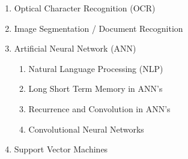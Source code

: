 \documentclass[12pt]{article}
\begin{document}
\begin{appendix}
      \begin{enumerate}
      \item Optical Character Recognition (OCR) \nocite{reul2019ocr4all} \nocite{sexton2005database}
      \item Image Segmentation / Document Recognition \nocite{lecun1998gradient} \nocite{suzuki2003infty}
      \item Artificial Neural Network (ANN) \nocite{cheng2017survey}
        \begin{enumerate}
        \item Natural Language Processing (NLP)
        \item Long Short Term Memory in ANN's
        \item Recurrence and Convolution in ANN's
        \item Convolutional Neural Networks
        \end{enumerate}
      \item Support Vector Machines
      \end{enumerate}
\end{appendix}
\end{document}
